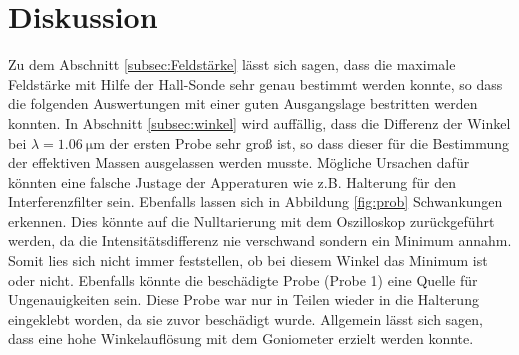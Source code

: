 \section{Diskussion}
\label{sec:Diskussion}
Zu dem Abschnitt \ref{subsec:Feldstärke} lässt sich sagen, dass die maximale Feldstärke mit Hilfe der Hall-Sonde sehr genau bestimmt werden konnte, so dass 
die folgenden Auswertungen mit einer guten Ausgangslage bestritten werden konnten.
In Abschnitt \ref{subsec:winkel} wird auffällig, dass die Differenz der Winkel bei $\lambda = \qty{1.06}{\micro\metre}$ der ersten Probe
sehr groß ist, so dass dieser für die Bestimmung der effektiven Massen ausgelassen werden musste. 
Mögliche Ursachen dafür könnten eine falsche Justage der Apperaturen wie z.B. Halterung für den Interferenzfilter sein.
Ebenfalls lassen sich in Abbildung \ref{fig:prob} Schwankungen erkennen.
Dies könnte auf die Nulltarierung mit dem Oszilloskop zurückgeführt werden, da die Intensitätsdifferenz nie verschwand sondern ein Minimum annahm. 
Somit lies sich nicht immer feststellen, ob bei diesem Winkel das Minimum ist oder nicht.
Ebenfalls könnte die beschädigte Probe (Probe 1) eine Quelle für Ungenauigkeiten sein. 
Diese Probe war nur in Teilen wieder in die Halterung eingeklebt worden, da sie zuvor beschädigt wurde.
Allgemein lässt sich sagen, dass eine hohe Winkelauflösung mit dem Goniometer erzielt werden konnte.